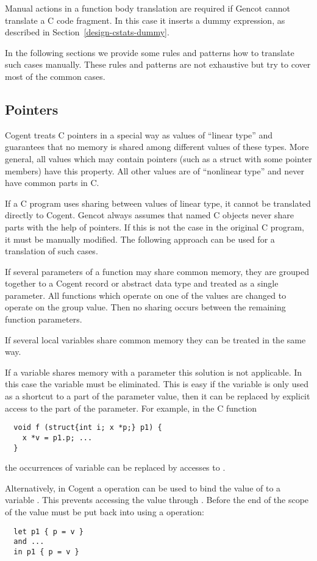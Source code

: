 Manual actions in a function body translation are required if Gencot cannot translate a C code fragment.
In this case it inserts a dummy expression, as described in Section~\ref{design-cstats-dummy}.

In the following sections we provide some rules and patterns how to translate such cases manually.
These rules and patterns are not exhaustive but try to cover most of the common cases.

\subsection{Pointers}
\label{app-transfunction-pointers}

Cogent treats C pointers in a special way as values of ``linear type'' and guarantees that no memory is shared
among different values of these types. More general, all values which may contain pointers (such as a struct with
some pointer members) have this property. All other values are of ``nonlinear type'' and never have common parts 
in C.

If a C program uses sharing between values of linear type, it cannot be translated directly to Cogent. Gencot always 
assumes that named C objects never share parts with the help of pointers. If this is not the case in the original 
C program, it must be manually modified. The following approach can be used for a translation of such cases. 

If several parameters of a function may share common memory, they are grouped together to a Cogent record or
abstract data type and treated as a single parameter. All functions which operate on one of the values are
changed to operate on the group value. Then no sharing occurs between the remaining function parameters.

If several local variables share common memory they can be treated in the same way. 

If a variable shares memory with a parameter this solution is not applicable. In this case the variable must be
eliminated. This is easy if the variable is only used as a shortcut to a part of the parameter value, then it
can be replaced by explicit access to the part of the parameter. For example, in the C function
\begin{verbatim}
  void f (struct{int i; x *p;} p1) {
    x *v = p1.p; ...
  }
\end{verbatim}
the occurrences of variable  can be replaced by accesses to .

Alternatively, in Cogent a  operation can be used to bind the value of  to a variable .
This prevents accessing the value through . Before the end of the scope of  the value must
be put back into  using a  operation:
\begin{verbatim}
  let p1 { p = v }
  and ...
  in p1 { p = v }
\end{verbatim}

